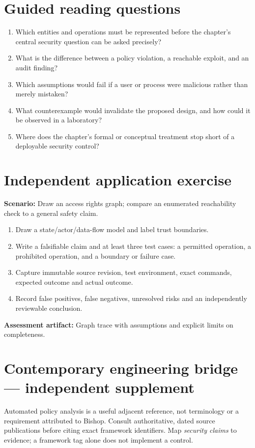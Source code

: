 \documentclass[10pt,letterpaper]{article}
\begin{document}
\section{Guided reading questions}
\begin{enumerate}
\item Which entities and operations must be represented before the chapter's central security question can be asked precisely?
\item What is the difference between a policy violation, a reachable exploit, and an audit finding?
\item Which assumptions would fail if a user or process were malicious rather than merely mistaken?
\item What counterexample would invalidate the proposed design, and how could it be observed in a laboratory?
\item Where does the chapter's formal or conceptual treatment stop short of a deployable security control?
\end{enumerate}
\section{Independent application exercise}
\textbf{Scenario:} Draw an access rights graph; compare an enumerated reachability check to a general safety claim.
\begin{enumerate}
\item Draw a state/actor/data-flow model and label trust boundaries.
\item Write a falsifiable claim and at least three test cases: a permitted operation, a prohibited operation, and a boundary or failure case.
\item Capture immutable source revision, test environment, exact commands, expected outcome and actual outcome.
\item Record false positives, false negatives, unresolved risks and an independently reviewable conclusion.
\end{enumerate}
\textbf{Assessment artifact:} Graph trace with assumptions and explicit limits on completeness.
\section{Contemporary engineering bridge --- independent supplement}
Automated policy analysis is a useful adjacent reference, not terminology or a requirement attributed to Bishop. Consult authoritative, dated source publications before citing exact framework identifiers. Map \emph{security claims} to evidence; a framework tag alone does not implement a control.
\end{document}

